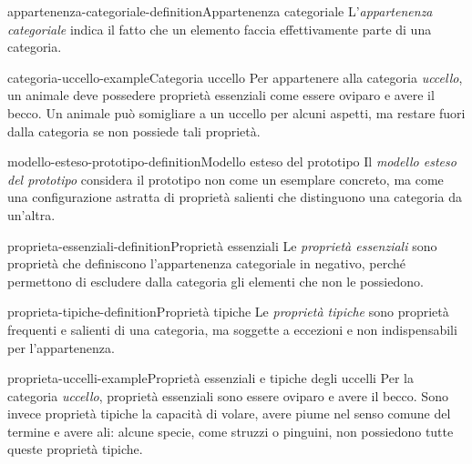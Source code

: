 \documentclass[preview]{standalone}
\begin{document}
\begin{snippetdefinition}{appartenenza-categoriale-definition}{Appartenenza categoriale}
    L'\emph{appartenenza categoriale} indica il fatto che un elemento faccia
    effettivamente parte di una categoria.
\end{snippetdefinition}

\begin{snippetexample}{categoria-uccello-example}{Categoria uccello}
    Per appartenere alla categoria \emph{uccello}, un animale deve possedere
    proprietà essenziali come essere oviparo e avere il becco. Un animale può
    somigliare a un uccello per alcuni aspetti, ma restare fuori dalla categoria
    se non possiede tali proprietà.
\end{snippetexample}

\begin{snippetdefinition}{modello-esteso-prototipo-definition}{Modello esteso del prototipo}
    Il \emph{modello esteso del prototipo} considera il prototipo non come un
    esemplare concreto, ma come una configurazione astratta di proprietà salienti
    che distinguono una categoria da un'altra.
\end{snippetdefinition}

\begin{snippetdefinition}{proprieta-essenziali-definition}{Proprietà essenziali}
    Le \emph{proprietà essenziali} sono proprietà che definiscono l'appartenenza
    categoriale in negativo, perché permettono di escludere dalla categoria gli
    elementi che non le possiedono.
\end{snippetdefinition}

\begin{snippetdefinition}{proprieta-tipiche-definition}{Proprietà tipiche}
    Le \emph{proprietà tipiche} sono proprietà frequenti e salienti di una
    categoria, ma soggette a eccezioni e non indispensabili per l'appartenenza.
\end{snippetdefinition}

\begin{snippetexample}{proprieta-uccelli-example}{Proprietà essenziali e tipiche degli uccelli}
    Per la categoria \emph{uccello}, proprietà essenziali sono essere oviparo e
    avere il becco. Sono invece proprietà tipiche la capacità di volare, avere
    piume nel senso comune del termine e avere ali: alcune specie, come struzzi
    o pinguini, non possiedono tutte queste proprietà tipiche.
\end{snippetexample}
\end{document}
